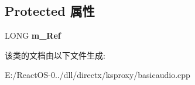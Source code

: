 \subsection*{Protected 属性}
\begin{DoxyCompactItemize}
\item 
\mbox{\label{class_c_ks_basic_audio_a67b5fefd888ebec77fad3c7a87c53719}} 
L\+O\+NG {\bfseries m\+\_\+\+Ref}
\end{DoxyCompactItemize}


该类的文档由以下文件生成\+:\begin{DoxyCompactItemize}
\item 
E\+:/\+React\+O\+S-\/0../dll/directx/ksproxy/basicaudio.\+cpp\end{DoxyCompactItemize}
